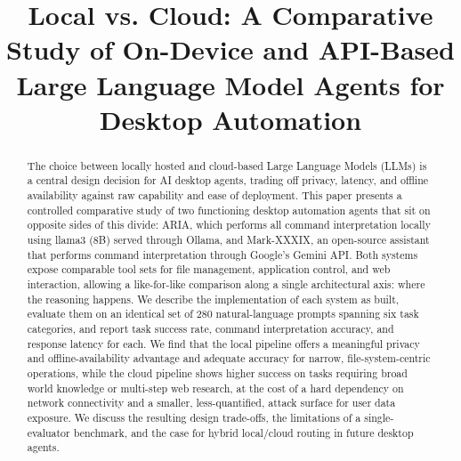 \documentclass[conference]{IEEEtran}
\begin{document}
\title{Local vs. Cloud: A Comparative Study of On-Device and API-Based Large Language Model Agents for Desktop Automation}

\author{
\and
{}
}

\maketitle

\begin{abstract}
The choice between locally hosted and cloud-based Large Language Models (LLMs) is a central design decision for AI desktop agents, trading off privacy, latency, and offline availability against raw capability and ease of deployment. This paper presents a controlled comparative study of two functioning desktop automation agents that sit on opposite sides of this divide: ARIA, which performs all command interpretation locally using llama3 (8B) served through Ollama, and Mark-XXXIX, an open-source assistant that performs command interpretation through Google's Gemini API. Both systems expose comparable tool sets for file management, application control, and web interaction, allowing a like-for-like comparison along a single architectural axis: where the reasoning happens. We describe the implementation of each system as built, evaluate them on an identical set of 280 natural-language prompts spanning six task categories, and report task success rate, command interpretation accuracy, and response latency for each. We find that the local pipeline offers a meaningful privacy and offline-availability advantage and adequate accuracy for narrow, file-system-centric operations, while the cloud pipeline shows higher success on tasks requiring broad world knowledge or multi-step web research, at the cost of a hard dependency on network connectivity and a smaller, less-quantified, attack surface for user data exposure. We discuss the resulting design trade-offs, the limitations of a single-evaluator benchmark, and the case for hybrid local/cloud routing in future desktop agents.
\end{abstract}
\end{document}
